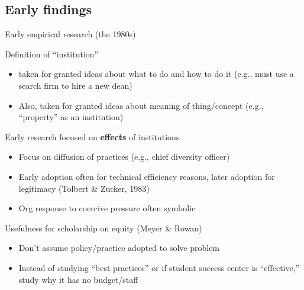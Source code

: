 \subsection{Early findings}

\begin{frame}{Early empirical research (the 1980s)}

	Definition of ``institution''
	\begin{itemize}
		\item taken for granted ideas about what to do and how to do it (e.g., must use a search firm to hire a new dean)
		\item Also, taken for granted ideas about meaning of thing/concept (e.g., ``property'' as an institution)

	\end{itemize}
	
	\vspace{2mm}
	Early research focused on \textbf{effects} of institutions
	\begin{itemize}
		\item Focus on diffusion of practices (e.g., chief diversity officer)
		\item Early adoption often for technical efficiency reasons, later adoption for legitimacy (Tolbert \& Zucker, 1983)
		\item Org response to coercive pressure often symbolic
	\end{itemize}
	\vspace{2mm}
	Usefulness for scholarship on equity (Meyer \& Rowan)
	\begin{itemize}
		\item Don't assume policy/practice adopted to solve problem
		\item Instead of studying ``best practices'' or if student success center is ``effective,'' study why it has no budget/staff
	\end{itemize}
\end{frame}

